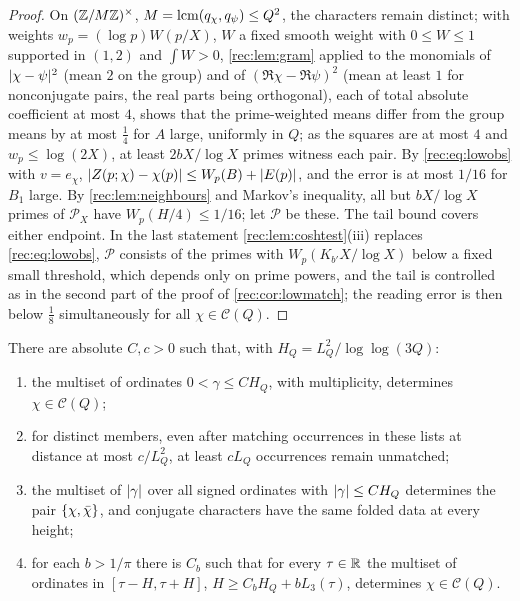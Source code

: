 \begin{proof}
On $(\mathbb{Z}/M\mathbb{Z})^\times$, $M=\operatorname{lcm}(q_\chi,q_\psi)\le Q^2$, the characters remain distinct; with weights
$w_p=(\log p)W(p/X)$, $W$ a fixed smooth weight with $0\le W\le1$ supported in $(1,2)$ and $\int W>0$, \cref{rec:lem:gram} applied to the monomials of $\lvert\chi-\psi\rvert^2$ (mean $2$ on the group)
and of $(\Re\chi-\Re\psi)^2$ (mean at least $1$ for nonconjugate pairs, the real parts being orthogonal),
each of total absolute coefficient at most $4$, shows that the prime-weighted means differ from the
group means by at most $\tfrac14$ for $A$ large, uniformly in $Q$; as the squares are at most $4$ and
$w_p\le\log(2X)$, at least $2bX/\log X$ primes witness each pair. By \eqref{rec:eq:lowobs} with $v=e_\chi$,
$\lvert Z(p;\chi)-\chi(p)\rvert\le W_p(B)+\lvert E(p)\rvert$, and the error is at most $1/16$ for $B_1$ large. By
\cref{rec:lem:neighbours} and Markov's inequality, all but $bX/\log X$ primes of $\mathcal P_X$ have
$W_p(H/4)\le1/16$; let $\mathcal P$ be these. The tail bound covers either endpoint. In the last
statement \cref{rec:lem:coshtest}(iii) replaces \eqref{rec:eq:lowobs}, $\mathcal P$ consists of the primes with
$W_p(K_{b'}X/\log X)$ below a fixed small threshold, which depends only on prime powers, and the tail is
controlled as in the second part of the proof of \cref{rec:cor:lowmatch}; the reading error is then
below $\tfrac18$ simultaneously for all $\chi\in\mathcal C(Q)$.
\end{proof}

\begin{theorem}\label{rec:thm:lowzero}
There are absolute $C,c>0$ such that, with $H_Q=L_Q^2/\log\log(3Q)$:
\begin{enumerate}
\item the multiset of ordinates $0<\gamma\le CH_Q$, with multiplicity, determines $\chi\in\mathcal C(Q)$;
\item for distinct members, even after matching occurrences in these lists at distance at most
$c/L_Q^2$, at least $cL_Q$ occurrences remain unmatched;
\item the multiset of $\lvert\gamma\rvert$ over all signed ordinates with $\lvert\gamma\rvert\le CH_Q$ determines the pair
$\{\chi,\bar\chi\}$, and conjugate characters have the same folded data at every height;
\item for each $b>1/\pi$ there is $C_b$ such that for every $\tau\in\mathbb{R}$ the multiset of ordinates in
$[\tau-H,\tau+H]$, $H\ge C_bH_Q+bL_3(\tau)$, determines $\chi\in\mathcal C(Q)$.
\end{enumerate}
\end{theorem}

